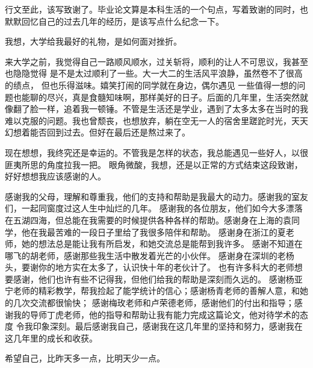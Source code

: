 
\begin{acknowledgements}

行文至此，该写致谢了。毕业论文算是本科生活的一个句点，写着致谢的同时，也默默回忆自己的过去几年的经历，是该写点什么纪念一下。

我想，大学给我最好的礼物，是如何面对挫折。

来大学之前，我觉得自己一路顺风顺水，过关斩将，顺利的让人不可思议，我甚至也隐隐觉得
是不是太过顺利了一些。大一大二的生活风平浪静，虽然卷不了很高的绩点，
但也乐得滋味。嬉笑打闹的同学就在身边，偶尔遇见
一些值得一想的问题也能聊的尽兴，真是食髓知味啊，那样美好的日子。后面的几年里，生活突然就像翻了脸一样，追着我一顿锤。不管是生活还是学业，遇到了太多太多在当时的我
难以克服的问题。我也曾颓丧，也想放弃，躺在空无一人的宿舍里蹉跎时光，天天幻想着能否回到过去。但好在最后还是熬过来了。

现在想想，我终究还是幸运的。不管我是怎样的状态，我总能遇见一些好人，以很匪夷所思的角度拉我一把。
眼角微酸，我想，还是以正常的方式结束这段致谢，好好想想我应该感谢的人。

感谢我的父母，理解和尊重我，他们的支持和帮助是我最大的动力。感谢我的室友们，一起同窗度过这人生中灿烂的几年。
感谢我的各位朋友，他们如今大多漂落在五湖四海，但总能在我需要的时候提供各种各样的帮助。感谢身在上海的袁同学，他在我最苦难的一段日子里给了我很多陪伴和帮助。
感谢身在浙江的夏老师，她的想法总是能让我有所启发，和她交流总是能帮到我许多。
感谢不知道在哪飞的胡老师，感谢那些我生活中散发着光芒的小伙伴。
感谢身在深圳的老杨头，要谢你的地方实在太多了，认识快十年的老伙计了。
也有许多科大的老师想要感谢，他们也许有些不记得我，但他们给我的帮助是深刻而久远的。
感谢杨亚宁老师的精彩教学，帮我捡起了能学统计的信心；感谢杨青老师的善解人意，和她的几次交流都很愉快；
感谢梅玫老师和卢荣德老师，感谢他们的付出和指导；感谢我的导师丁虎老师，他的指导和帮助让我有能力完成这篇论文，他对待学术的态度
令我印象深刻。最后感谢我自己，感谢我在这几年里的坚持和努力，感谢我在这几年里的成长和收获。

希望自己，比昨天多一点，比明天少一点。



\end{acknowledgements}


